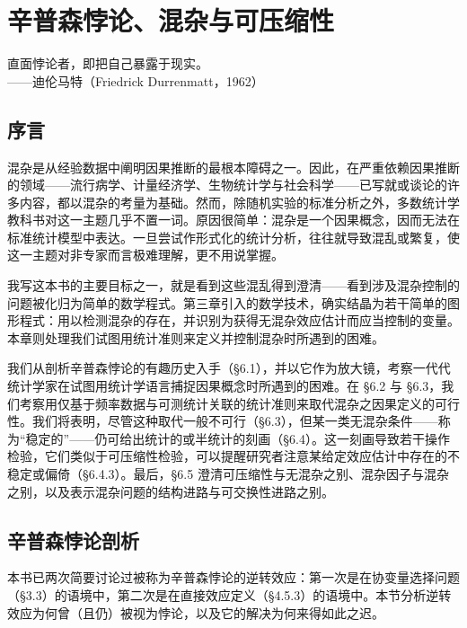 \chapter{辛普森悖论、混杂与可压缩性}

\begin{flushright}
\kaishu\small
直面悖论者，即把自己暴露于现实。\\[2pt]
——迪伦马特（Friedrick Durrenmatt，1962）
\end{flushright}

\section*{序言}

混杂是从经验数据中阐明因果推断的最根本障碍之一。因此，在严重依赖因果推断的领域——流行病学、计量经济学、生物统计学与社会科学——已写就或谈论的许多内容，都以混杂的考量为基础。然而，除随机实验的标准分析之外，多数统计学教科书对这一主题几乎不置一词。原因很简单：混杂是一个因果概念，因而无法在标准统计模型中表达。一旦尝试作形式化的统计分析，往往就导致混乱或繁复，使这一主题对非专家而言极难理解，更不用说掌握。

我写这本书的主要目标之一，就是看到这些混乱得到澄清——看到涉及混杂控制的问题被化归为简单的数学程式。第三章引入的数学技术，确实结晶为若干简单的图形程式：用以检测混杂的存在，并识别为获得无混杂效应估计而应当控制的变量。本章则处理我们试图用统计准则来定义并控制混杂时所遇到的困难。

我们从剖析辛普森悖论的有趣历史入手（\S 6.1），并以它作为放大镜，考察一代代统计学家在试图用统计学语言捕捉因果概念时所遇到的困难。在 \S 6.2 与 \S 6.3，我们考察用仅基于频率数据与可测统计关联的统计准则来取代混杂之因果定义的可行性。我们将表明，尽管这种取代一般不可行（\S 6.3），但某一类无混杂条件——称为“稳定的”——仍可给出统计的或半统计的刻画（\S 6.4）。这一刻画导致若干操作检验，它们类似于可压缩性检验，可以提醒研究者注意某给定效应估计中存在的不稳定或偏倚（\S 6.4.3）。最后，\S 6.5 澄清可压缩性与无混杂之别、混杂因子与混杂之别，以及表示混杂问题的结构进路与可交换性进路之别。

\section{辛普森悖论剖析}

本书已两次简要讨论过被称为辛普森悖论的逆转效应：第一次是在协变量选择问题（\S 3.3）的语境中，第二次是在直接效应定义（\S 4.5.3）的语境中。本节分析逆转效应为何曾（且仍）被视为悖论，以及它的解决为何来得如此之迟。

